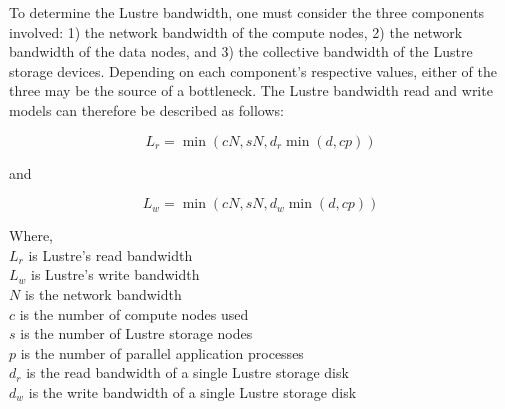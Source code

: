       To determine the Lustre bandwidth, one must consider the three components
  involved: 1) the network bandwidth of the compute nodes, 2) the network
  bandwidth of the data nodes, and 3) the collective bandwidth of the Lustre
  storage devices. Depending on each component's respective values, either of
  the three may be the source of a bottleneck. The Lustre bandwidth read and
  write models can therefore be described as follows:

    \begin{equation} %
        L_{r} = \min{(cN, sN, d_{r}\min{(d, cp)})}
    \end{equation}

    and


    \begin{equation}%
        L_{w} = \min{(cN, sN, d_{w}\min{(d, cp)})}
    \end{equation}

    Where, \\
    $L_{r}$ is Lustre's read bandwidth \\
    $L_{w}$ is Lustre's write bandwidth \\
    $N$ is the network bandwidth \\
    $c$ is the number of compute nodes used \\
    $s$ is the number of Lustre storage nodes \\
    $p$ is the number of parallel application processes \\
    $d_{r}$ is the read bandwidth of a single Lustre storage disk \\
    $d_{w}$ is the write bandwidth of a single Lustre storage disk \\



